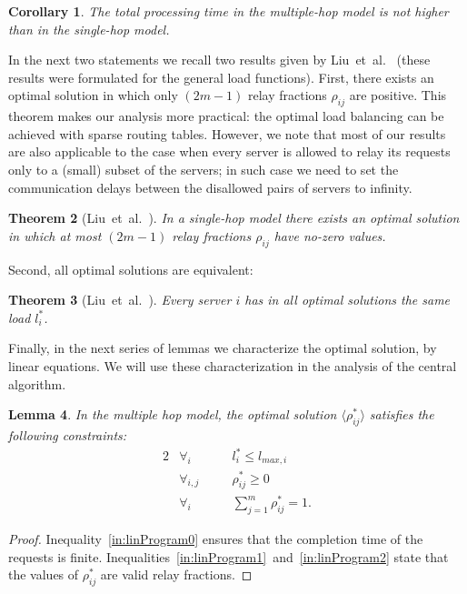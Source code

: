 \documentclass[11pt]{article}
\newcommand{\lmaxi}{{{l_{\mathit{max}, i}}}}
\newtheorem{theorem}{Theorem}
\newtheorem{corollary}[theorem]{Corollary}
\newtheorem{lemma}[theorem]{Lemma}
\begin{document}
\begin{corollary}\label{prop:multiBellerSingleHop}
The total processing time in the multiple-hop model is not higher than in the single-hop model.
\end{corollary}

In the next two statements we recall two results given by Liu~et~al.~\cite{Liu:2011:GGL:1993744.1993767} (these results were formulated for the general load functions). 
First, there exists an optimal solution in which only $(2m-1)$ relay fractions $\rho_{ij}$ are positive. This theorem makes our analysis more practical: the optimal load balancing can be achieved with sparse routing tables. However, we note that most of our results are also applicable to the case when every server is allowed to relay its requests only to a (small) subset of the servers; in such case we need to set the communication delays between the disallowed pairs of servers to infinity. 


\begin{theorem}[Liu~et~al.~\cite{Liu:2011:GGL:1993744.1993767}]
In a single-hop model there exists an optimal solution in which at most $(2m-1)$ relay fractions $\rho_{ij}$ have no-zero values.
\end{theorem}

Second, all optimal solutions are equivalent:
\begin{theorem}[Liu~et~al.~\cite{Liu:2011:GGL:1993744.1993767}]
Every server $i$ has in all optimal solutions the same load $l^{*}_i$.
\end{theorem}

Finally, in the next series of lemmas we characterize the optimal solution, by linear equations. We will use these characterization in the analysis of the central algorithm.

\begin{lemma}\label{lemma:linProg1}
In the multiple hop model, the optimal solution $\langle \rho_{ij}^{*} \rangle$ satisfies the following constraints:
\begin{alignat}{2}
 & \forall_{i}  \ & \;\; \ &    l_{i}^{*} \leq  \lmaxi  \label{in:linProgram0} \\ 
 & \forall_{i, j} \ & \; \; \ &  \rho^{*}_{ij}  \geq  0 \label{in:linProgram1} \\ 
 & \forall_{i} \ & \; \; \ &     \sum_{j=1}^{m} \rho^{*}_{ij} = 1 \text{.} \label{in:linProgram2} 
\end{alignat}
\end{lemma}
\begin{proof}
Inequality~\ref{in:linProgram0} ensures that the completion time of the requests is finite.
Inequalities~\ref{in:linProgram1}~and~\ref{in:linProgram2} state that the values of $\rho^{*}_{ij}$ are valid relay fractions.
\end{proof}
\end{document}
